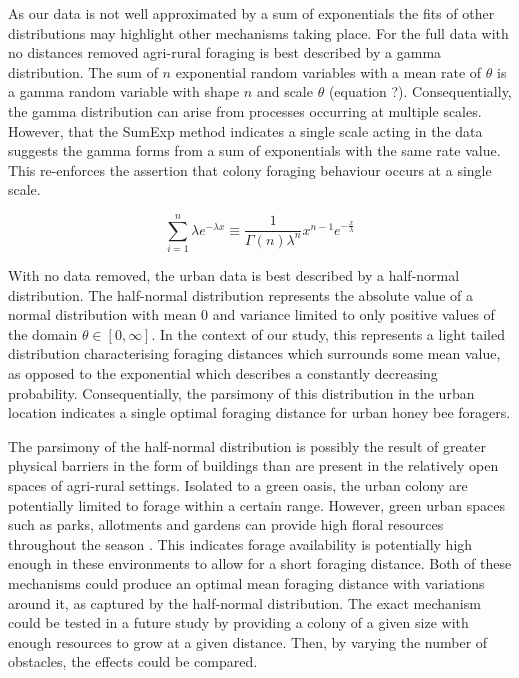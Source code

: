 \documentclass[11pt,usenames,dvipsnames]{article}
\begin{document}
As our data is not well approximated by a sum of exponentials the fits of other distributions may highlight other mechanisms taking place. For the full data with no distances removed agri-rural foraging is best described by a gamma distribution. The sum of $n$ exponential random variables with a mean rate of $\theta$ is a gamma random variable with shape $n$ and scale $\theta$ (equation ?). Consequentially, the gamma distribution can arise from processes occurring at multiple scales. However, that the SumExp method indicates a single scale acting in the data suggests the gamma forms from a sum of exponentials with the same rate value. This re-enforces the assertion that colony foraging behaviour occurs at a single scale.

\begin{equation}
\sum_{i=1}^{n} \lambda e^{-\lambda x} \equiv \frac{1}{\Gamma(n)\lambda^n}x^{n-1}e^{-\frac{x}{\lambda}}
\end{equation}

With no data removed, the urban data is best described by a half-normal distribution. The half-normal distribution represents the absolute value of a normal distribution with mean 0 and variance limited to only positive values of the domain $\theta \in [0,\infty] $. In the context of our study, this represents a light tailed distribution characterising foraging distances which surrounds some mean value, as opposed to the exponential which describes a constantly decreasing probability. Consequentially, the parsimony of this distribution in the urban location indicates a single optimal foraging distance for urban honey bee foragers. 

The parsimony of the half-normal distribution is possibly the result of greater physical barriers in the form of buildings than are present in the relatively open spaces of agri-rural settings. Isolated to a green oasis, the urban colony are potentially limited to forage within a certain range. However, green urban spaces such as parks, allotments and gardens can provide high floral resources throughout the season \citep{Baldock2015, Baldock2019, Plascencia2017}. This indicates forage availability is potentially high enough in these environments to allow for a short foraging distance. Both of these mechanisms could produce an optimal mean foraging distance with variations around it, as captured by the half-normal distribution. The exact mechanism could be tested in a future study by providing a colony of a given size with enough resources to grow at a given distance. Then, by varying the number of obstacles, the effects could be compared. 
\end{document}
